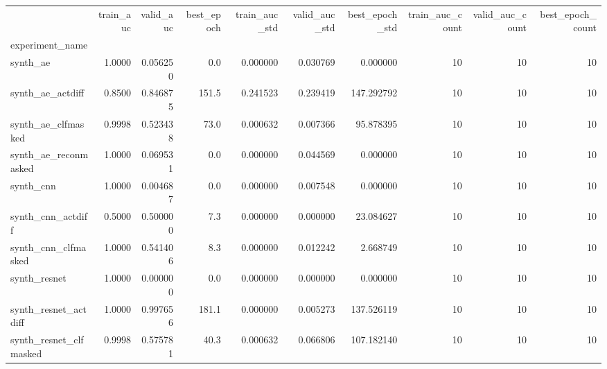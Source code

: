 \begin{tabular}{lrrrrrrrrr}
\toprule
{} &  train\_auc &  valid\_auc &  best\_epoch &  train\_auc\_std &  valid\_auc\_std &  best\_epoch\_std &  train\_auc\_count &  valid\_auc\_count &  best\_epoch\_count \\
experiment\_name        &            &            &             &                &                &                 &                  &                  &                   \\
\midrule
synth\_ae               &     1.0000 &   0.056250 &         0.0 &       0.000000 &       0.030769 &        0.000000 &               10 &               10 &                10 \\
synth\_ae\_actdiff       &     0.8500 &   0.846875 &       151.5 &       0.241523 &       0.239419 &      147.292792 &               10 &               10 &                10 \\
synth\_ae\_clfmasked     &     0.9998 &   0.523438 &        73.0 &       0.000632 &       0.007366 &       95.878395 &               10 &               10 &                10 \\
synth\_ae\_reconmasked   &     1.0000 &   0.069531 &         0.0 &       0.000000 &       0.044569 &        0.000000 &               10 &               10 &                10 \\
synth\_cnn              &     1.0000 &   0.004687 &         0.0 &       0.000000 &       0.007548 &        0.000000 &               10 &               10 &                10 \\
synth\_cnn\_actdiff      &     0.5000 &   0.500000 &         7.3 &       0.000000 &       0.000000 &       23.084627 &               10 &               10 &                10 \\
synth\_cnn\_clfmasked    &     1.0000 &   0.541406 &         8.3 &       0.000000 &       0.012242 &        2.668749 &               10 &               10 &                10 \\
synth\_resnet           &     1.0000 &   0.000000 &         0.0 &       0.000000 &       0.000000 &        0.000000 &               10 &               10 &                10 \\
synth\_resnet\_actdiff   &     1.0000 &   0.997656 &       181.1 &       0.000000 &       0.005273 &      137.526119 &               10 &               10 &                10 \\
synth\_resnet\_clfmasked &     0.9998 &   0.575781 &        40.3 &       0.000632 &       0.066806 &      107.182140 &               10 &               10 &                10 \\

\end{tabular}
